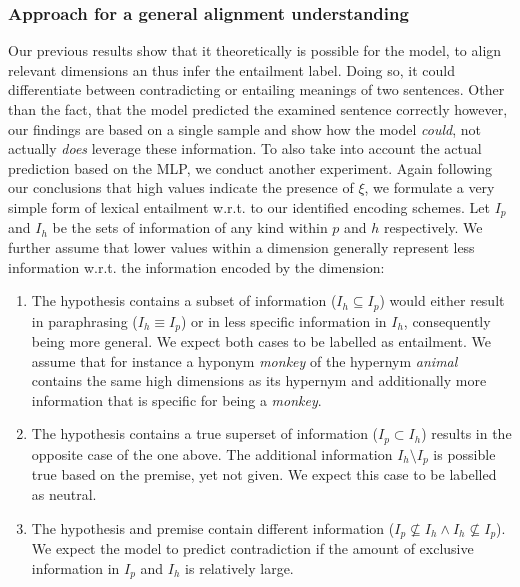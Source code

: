 \subsubsection{Approach for a general alignment understanding}\label{sec:approach_general_alignment_understanding}
Our previous results show that it theoretically is possible for the model, to align relevant dimensions an thus infer the entailment label. Doing so, it could differentiate between contradicting or entailing meanings of two sentences. Other than the fact, that the model predicted the examined sentence correctly however, our findings are based on a single sample and show how the model \textit{could}, not actually \textit{does} leverage these information. To also take into account the actual prediction based on the \ac{MLP}, we conduct another experiment. Again following our conclusions that high values indicate the presence of $\xi$, we formulate a very simple form of lexical entailment w.r.t. to our identified encoding schemes. Let $I_p$ and $I_h$ be the sets of information of any kind within $p$ and $h$ respectively. We further assume that lower values within a dimension generally represent less information w.r.t. the information encoded by the dimension:
\begin{enumerate}
\item The hypothesis contains a subset of information ($I_h \subseteq I_p$) would either result in paraphrasing ($I_h \equiv I_p$) or in less specific information in $I_h$, consequently being more general. We expect both cases to be labelled as entailment. We assume that for instance a hyponym \textit{monkey} of the hypernym \textit{animal} contains the same high dimensions as its hypernym and additionally more information that is specific for being a \textit{monkey}.
\item The hypothesis contains a true superset of information ($I_p \subset I_h$) results in the opposite case of the one above. The additional information $I_h \setminus I_p$ is possible true based on the premise, yet not given. We expect this case to be labelled as neutral.
\item The hypothesis and premise contain different information ($I_p \nsubseteq I_h \land I_h \nsubseteq I_p$). We expect the model to predict contradiction if the amount of exclusive information in $I_p$ and $I_h$ is relatively large.
\end{enumerate}

